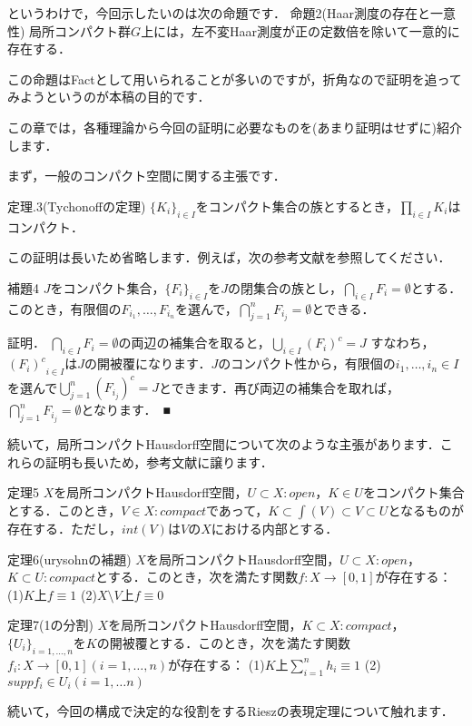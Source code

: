 というわけで，今回示したいのは次の命題です．
命題2(Haar測度の存在と一意性)
局所コンパクト群$G$上には，左不変Haar測度が正の定数倍を除いて一意的に存在する．

この命題はFactとして用いられることが多いのですが，折角なので証明を追ってみようというのが本稿の目的です．

この章では，各種理論から今回の証明に必要なものを(あまり証明はせずに)紹介します．

まず，一般のコンパクト空間に関する主張です．

定理.3(Tychonoffの定理)
$\{ K_i \} _{i \in I}$をコンパクト集合の族とするとき，$\prod_{i \in I} K_i$はコンパクト．

この証明は長いため省略します．例えば，次の参考文献を参照してください．

補題4
$J$をコンパクト集合，$\{ F_i \}_{i \in I}$を$J$の閉集合の族とし，$\bigcap_{i \in I}F_i = \emptyset$とする．このとき，有限個の$F_{i_1}, \ldots , F_{i_n}$を選んで，$\bigcap_{j=1}^{n}F_{i_j} = \emptyset$とできる．

証明．
$\bigcap_{i \in I}F_i = \emptyset$の両辺の補集合を取ると，$\bigcup_{i \in I}(F_i)^{c} = J$ すなわち，${(F_i)^{c}}_{i \in I}$は$J$の開被覆になります．$J$のコンパクト性から，有限個の$i_1, \ldots , i_n \in I$を選んで$\bigcup_{j=1}^{n}(F_{i_j})^{c} = J$とできます．再び両辺の補集合を取れば，$\bigcap_{j=1}^{n}F_{i_j} = \emptyset$となります．　■

続いて，局所コンパクトHausdorff空間について次のような主張があります．これらの証明も長いため，参考文献に譲ります．

定理5
$X$を局所コンパクトHausdorff空間，$U \subset X \colon open$，$K \in U$をコンパクト集合とする．このとき，$V \in X :compact$であって，$K \subset \int(V) \subset V \subset U$となるものが存在する．ただし，$int(V)$は$V$の$X$における内部とする．

定理6(urysohnの補題)
$X$を局所コンパクトHausdorff空間，$U \subset X \colon open$，$K \subset U \colon compact$とする．このとき，次を満たす関数$f \colon X \to [0, 1]$が存在する：
(1)$K$上$f \equiv 1$
(2)$X \setminus V$上$f \equiv 0$

定理7(1の分割)
$X$を局所コンパクトHausdorff空間，$K \subset X \colon compact$，$\{ U_i \}_{i=1, \ldots , n}$を$K$の開被覆とする．このとき，次を満たす関数$f_i \colon X \to [0,1] (i=1, \ldots , n)$が存在する：
(1)$K$上$\sum_{i=1}^{n}h_i \equiv 1$
(2)$supp f_i \in U_i (i=1, \ldots n)$

続いて，今回の構成で決定的な役割をするRieszの表現定理について触れます．


